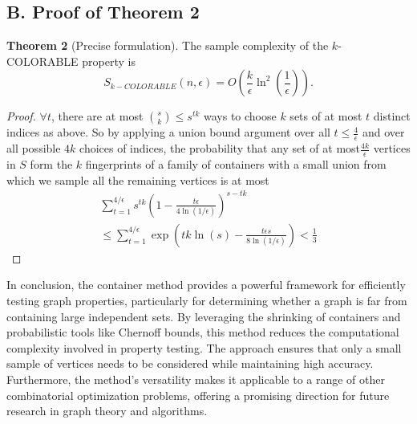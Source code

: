 \documentclass[preprint,11pt]{elsarticle}
\theoremstyle{definition}
\begin{document}
\begin{multicols}{2}
\subsection*{B. Proof of Theorem 2}
\textbf{Theorem 2} (Precise formulation). The sample complexity of
the $k$-COLORABLE property is
\[S_{k-COLORABLE}(n,\epsilon)=O\left(\frac{k}{\epsilon}\ln^{2}\left(\frac{1}{\epsilon}\right)\right).\]
\begin{proof}
$\forall t$,  there are at most  $\binom{s}{k} \leq s^{tk}$ ways to choose  $k$ sets of at most $t$ distinct indices as above. So by applying a union bound argument over all  $t \leq \frac{4}{\epsilon}$ and over all possible  $4k$ 
choices of indices, the probability that any set of at most$ \frac{4k}{\epsilon}$ vertices in  $S$ form the  $k$ fingerprints of a family of containers with a small union from which we sample all the remaining vertices is at most
\begin{align*}
\sum_{t=1}^{4/\epsilon} s^{tk} \left(1 - \frac{t \epsilon}{4 \ln(1/\epsilon)}\right)^{s-tk} \\
\leq \sum_{t=1}^{4/\epsilon} \exp \left( tk \ln(s) - \frac{t \epsilon s}{8 \ln(1/\epsilon)}\right) < \frac{1}{3}
\end{align*}   
\end{proof}
In conclusion, the container method provides a powerful framework for efficiently testing graph properties, particularly for determining whether a graph is far from containing large independent sets. By leveraging the shrinking of containers and probabilistic tools like Chernoff bounds, this method reduces the computational complexity involved in property testing. The approach ensures that only a small sample of vertices needs to be considered while maintaining high accuracy. Furthermore, the method's versatility makes it applicable to a range of other combinatorial optimization problems, offering a promising direction for future research in graph theory and algorithms.


\end{multicols}
\end{document}
